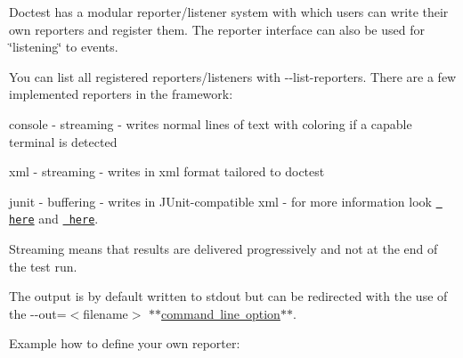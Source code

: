 Doctest has a modular reporter/listener system with which users can write their own reporters and register them. The reporter interface can also be used for \char`\"{}listening\char`\"{} to events.

You can list all registered reporters/listeners with {\ttfamily -\/-\/list-\/reporters}. There are a few implemented reporters in the framework\+:
\begin{DoxyItemize}
\item {\ttfamily console} -\/ streaming -\/ writes normal lines of text with coloring if a capable terminal is detected
\item {\ttfamily xml} -\/ streaming -\/ writes in xml format tailored to doctest
\item {\ttfamily junit} -\/ buffering -\/ writes in JUnit-\/compatible xml -\/ for more information look \href{https://github.com/onqtam/doctest/issues/318}{\texttt{ here}} and \href{https://github.com/onqtam/doctest/issues/376}{\texttt{ here}}.
\end{DoxyItemize}

Streaming means that results are delivered progressively and not at the end of the test run.

The output is by default written to {\ttfamily stdout} but can be redirected with the use of the {\ttfamily -\/-\/out=$<$filename$>$} \mbox{\hyperlink{md__c___users__u_s_e_r_source_repos_bzareva_star_wars_universe_0_1_doctest_doc_markdown_commandline}{$\ast$$\ast$command line option$\ast$$\ast$}}.

Example how to define your own reporter\+:


